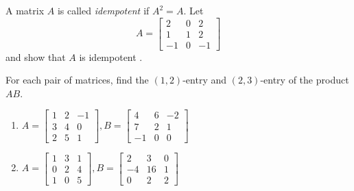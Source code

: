\documentclass{ximera}
\begin{document}
\begin{problem}\label{prb:4.24} A matrix $A$ is called {\em idempotent \em}if $A^{2}=A.$
Let
\begin{equation*}
A=
\left[
\begin{array}{rrr}
2 & 0 & 2 \\
1 & 1 & 2 \\
-1 & 0 & -1
\end{array}
\right]
\end{equation*}
and show that $A$ is idempotent .
\end{problem}

\begin{problem}\label{prb:4.25} For each pair of matrices, find the $(1,2)$-entry and $(2,3)$-entry of the product $AB$.
\begin{enumerate}
\item
$A = \left[ \begin{array}{rrr}
1 & 2 & -1 \\
3 & 4 & 0 \\
2 & 5 & 1
\end{array} \right], B = \left[ \begin{array}{rrr}
4 & 6 & -2 \\
7 & 2 & 1 \\
-1 & 0 & 0
\end{array} \right]$
\item
$A = \left[ \begin{array}{rrr}
1 & 3 & 1 \\
0 & 2 & 4 \\
1 & 0 & 5
\end{array} \right], B = \left[ \begin{array}{rrr}
2 & 3 & 0 \\
-4 & 16 & 1 \\
0 & 2 & 2
\end{array} \right]$
\end{enumerate}
\end{problem}
\end{document}
